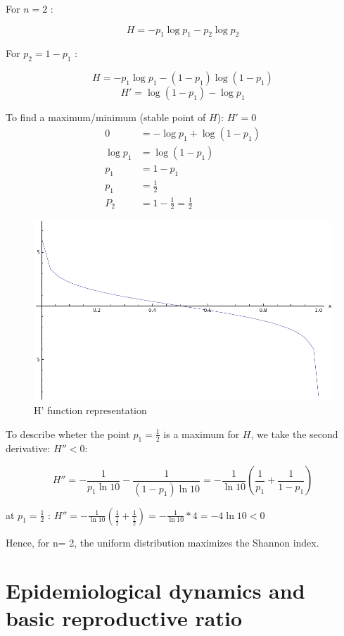 For $n = 2$ :

\[ H = -p_1\log p_1 - p_2\log p_2 \]

For $p_2 = 1-p_1$ :

\[ H  = -p_1\log p_1 - (1-p_1) \log(1-p_1) \] 
\[H' = \log (1 - p_1) - \log p_1 \]

To find a maximum/minimum (stable point of $H$): $H' = 0$
\begin{align*}
0 &= -\log p_1 + \log (1-p_1)\\
\log p_1 &= \log (1-p_1)\\
p_1 &= 1-p_1\\
p_1 &= \frac{1}{2} \\
P_2 &= 1 - \frac{1}{2} = \frac{1}{2}
\end{align*}

\begin{figure}[htbp]
\centering
\includegraphics[scale=0.6]{./images/graph01}
\caption{H' function representation}
\label{fig:graph01}
\end{figure}

To describe wheter the point $p_1 = \frac{1}{2}$ is a maximum for $H$, we take the second derivative: $H'' < 0$:


\[  H'' = -\frac{1}{p_1\ln 10 } - \frac{1}{(1-p_1)\ln 10} = -\frac{1}{\ln 10} \left(\frac{1}{p_1}+\frac{1}{1-p_1}\right)\]

at $p_1 = \frac{1}{2}$ : $H'' = -\frac{1}{\ln 10} \left(\frac{1}{\frac{1}{2}}+\frac{1}{\frac{1}{2}}\right) = -\frac{1}{\ln 10} * 4 = -4\ln 10 < 0$

Hence, for n= 2, the uniform distribution maximizes the Shannon index.


\setcounter{chapter}{2}
\setcounter{section}{0}
\section{Epidemiological dynamics and basic reproductive ratio}

